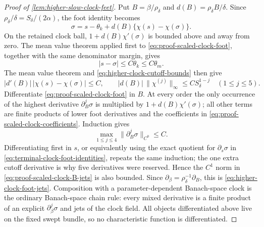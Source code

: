 \begin{proof}[Proof of \cref{lem:higher-slow-clock-feet}]
Put \(B=\beta/\rho_\delta\) and
\(d(B)=\rho_\delta B/\delta\).  Since
\(\rho_\delta/\delta=S_\delta/(2\alpha)\), the foot identity becomes
\begin{equation}
 \sigma=s-\theta_k+d(B)\{\chi(s)-\chi(\sigma)\}.             \label{eq:proof-scaled-clock-foot}
\end{equation}
On the retained clock ball,
\(1+d(B)\chi'(\sigma)\) is bounded above and away from zero.  The mean
value theorem applied first to
\cref{eq:proof-scaled-clock-foot}, together with the same denominator
margin, gives
\begin{equation}
 |s-\sigma|\le C\theta_k\le C\theta_m.            \label{eq:proof-scaled-clock-foot-distance}
\end{equation}
The mean value theorem and \cref{eq:higher-clock-cutoff-bounds} then give
\begin{equation}
 |d'(B)|\,|\chi(s)-\chi(\sigma)|\le C,
 \qquad
 |d(B)|\,\|\chi^{(j)}\|_\infty\le C S_\delta^{1-j}
 \quad(1\le j\le5).                              \label{eq:proof-scaled-clock-coefficients}
\end{equation}
Differentiate \cref{eq:proof-scaled-clock-foot} in \(B\).  At every
order the only occurrence of the highest derivative
\(\partial_B^j\sigma\) is multiplied by
\(1+d(B)\chi'(\sigma)\); all other terms are finite products of lower
foot derivatives and the coefficients in
\cref{eq:proof-scaled-clock-coefficients}.  Induction gives
\begin{equation}
 \max_{1\le j\le4}\|\partial_B^j\sigma\|_{C^0}\le C.       \label{eq:proof-scaled-clock-B-jets}
\end{equation}
Differentiating first in \(s\), or equivalently using the exact quotient
for \(\partial_s\sigma\) in
\cref{eq:terminal-clock-foot-identities}, repeats the same induction; the
one extra cutoff derivative is why five derivatives were reserved.  Hence
the \(C^1\) norm in
\cref{eq:proof-scaled-clock-B-jets} is also bounded.  Since
\(\partial_\beta=\rho_\delta^{-1}\partial_B\), this is
\cref{eq:higher-clock-foot-jets}.  Composition with a parameter-dependent
Banach-space clock is the ordinary Banach-space chain rule: every mixed
derivative is a finite product of an explicit \(\partial_\beta^j\sigma\)
and jets of the clock field.  All
objects differentiated above live on the fixed swept bundle, so no
characteristic function is differentiated.
\end{proof}

